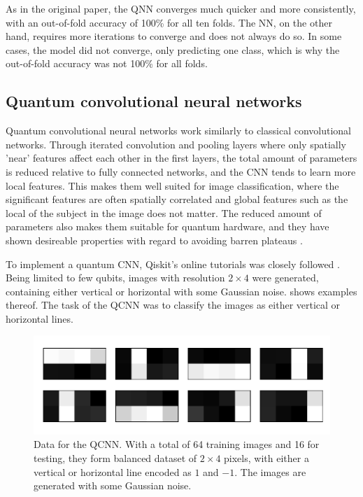 As in the original paper, the QNN converges much quicker and more consistently, with an out-of-fold accuracy of 100\% for all ten folds. The NN, on the other hand, requires more iterations to converge and does not always do so. In some cases, the model did not converge, only predicting one class, which is why the out-of-fold accuracy was not 100\% for all folds.


\subsection{Quantum convolutional neural networks}
Quantum convolutional neural networks work similarly to classical convolutional networks. Through iterated convolution and pooling layers where only spatially 'near' features affect each other in the first layers, the total amount of parameters is reduced relative to fully connected networks, and the CNN tends to learn more local features. This makes them well suited for image classification, where the significant features are often spatially correlated and global features such as the local of the subject in the image does not matter. The reduced amount of parameters also makes them suitable for quantum hardware, and they have shown desireable properties with regard to avoiding barren plateaus \cite{pesah2021}.

To implement a quantum CNN, Qiskit's online tutorials was closely followed \cite{qiskit_qcnn}. Being limited to few qubits, images with resolution $2\times4$ were generated, containing either vertical or horizontal with some Gaussian noise.  shows examples thereof. The task of the QCNN was to classify the images as either vertical or horizontal lines.

\begin{figure}
    \centering
    \includegraphics[width=\textwidth]{../code/qcnn/data.pdf}
    \caption{Data for the QCNN. With a total of 64 training images and 16 for testing, they form balanced dataset of $2\times4$ pixels, with either a vertical or horizontal line encoded as $1$ and $-1$. The images are generated with some Gaussian noise.}
    \label{fig:qcnn_data}
\end{figure}


